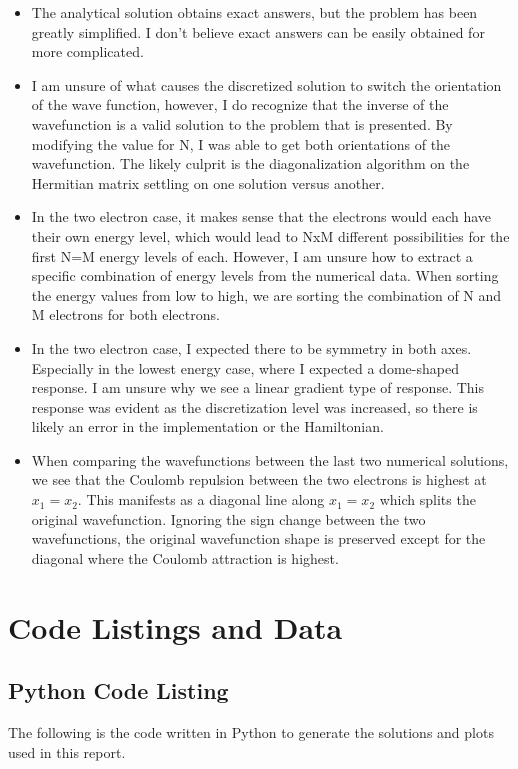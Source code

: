 \documentclass[10pt, oneside, letterpaper]{article}
\begin{document}
\begin{itemize}
    \item The analytical solution obtains exact answers, but the problem has been greatly simplified. I don't believe exact answers can be easily obtained for more complicated.
    \item I am unsure of what causes the discretized solution to switch the orientation of the wave function, however, I do recognize that the inverse of the wavefunction is a valid solution to the problem that is presented. By modifying the value for N, I was able to get both orientations of the wavefunction. The likely culprit is the diagonalization algorithm on the Hermitian matrix settling on one solution versus another.
    \item In the two electron case, it makes sense that the electrons would each have their own energy level, which would lead to NxM different possibilities for the first N=M energy levels of each. However, I am unsure how to extract a specific combination of energy levels from the numerical data. When sorting the energy values from low to high, we are sorting the combination of N and M electrons for both electrons.
    \item In the two electron case, I expected there to be symmetry in both axes. Especially in the lowest energy case, where I expected a dome-shaped response. I am unsure why we see a linear gradient type of response. This response was evident as the discretization level was increased, so there is likely an error in the implementation or the Hamiltonian.
    \item When comparing the wavefunctions between the last two numerical solutions, we see that the Coulomb repulsion between the two electrons is highest at $x_1 = x_2$. This manifests as a diagonal line along $x_1 = x_2$ which splits the original wavefunction. Ignoring the sign change between the two wavefunctions, the original wavefunction shape is preserved except for the diagonal where the Coulomb attraction is highest.
\end{itemize}

\newpage
\section{Code Listings and Data}

\subsection{Python Code Listing}
\label{code-listing-python}
The following is the code written in Python to generate the solutions and plots used in this report.

\end{document}
